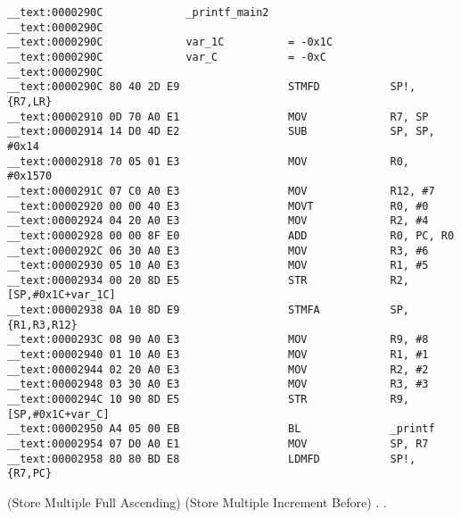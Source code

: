 \begin{lstlisting}
__text:0000290C             _printf_main2
__text:0000290C
__text:0000290C             var_1C          = -0x1C
__text:0000290C             var_C           = -0xC
__text:0000290C
__text:0000290C 80 40 2D E9                 STMFD           SP!, {R7,LR}
__text:00002910 0D 70 A0 E1                 MOV             R7, SP
__text:00002914 14 D0 4D E2                 SUB             SP, SP, #0x14
__text:00002918 70 05 01 E3                 MOV             R0, #0x1570
__text:0000291C 07 C0 A0 E3                 MOV             R12, #7
__text:00002920 00 00 40 E3                 MOVT            R0, #0
__text:00002924 04 20 A0 E3                 MOV             R2, #4
__text:00002928 00 00 8F E0                 ADD             R0, PC, R0
__text:0000292C 06 30 A0 E3                 MOV             R3, #6
__text:00002930 05 10 A0 E3                 MOV             R1, #5
__text:00002934 00 20 8D E5                 STR             R2, [SP,#0x1C+var_1C]
__text:00002938 0A 10 8D E9                 STMFA           SP, {R1,R3,R12}
__text:0000293C 08 90 A0 E3                 MOV             R9, #8
__text:00002940 01 10 A0 E3                 MOV             R1, #1
__text:00002944 02 20 A0 E3                 MOV             R2, #2
__text:00002948 03 30 A0 E3                 MOV             R3, #3
__text:0000294C 10 90 8D E5                 STR             R9, [SP,#0x1C+var_C]
__text:00002950 A4 05 00 EB                 BL              _printf
__text:00002954 07 D0 A0 E1                 MOV             SP, R7
__text:00002958 80 80 BD E8                 LDMFD           SP!, {R7,PC}
\end{lstlisting}

  (Store Multiple Full Ascending) 
 (Store Multiple Increment Before) . 
.

